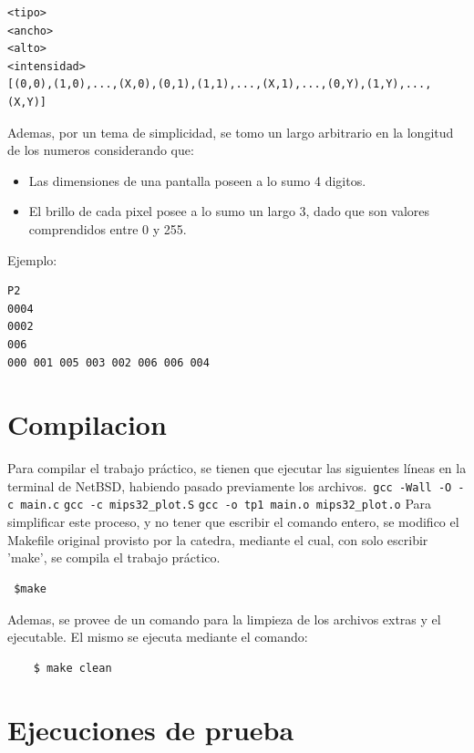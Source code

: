 \documentclass[10pt,spanish,a4paper,openany,notitlepage]{article}
\begin{document}
\begin{framed}
\begin{verbatim}<tipo>
<ancho>
<alto>
<intensidad>
[(0,0),(1,0),...,(X,0),(0,1),(1,1),...,(X,1),...,(0,Y),(1,Y),...,(X,Y)]
\end{verbatim}
\end{framed}

Ademas, por un tema de simplicidad, se tomo un largo arbitrario en la longitud de los numeros considerando que:
\begin{itemize}
\item Las dimensiones de una pantalla poseen a lo sumo 4 digitos.
\item El brillo de cada pixel posee a lo sumo un largo 3, dado que son valores comprendidos entre 0 y 255. 
\end{itemize}
Ejemplo:
\begin{framed}
\begin{verbatim}P2
0004
0002
006
000 001 005 003 002 006 006 004\end{verbatim}
\end{framed}

\section{Compilacion}
Para compilar el trabajo práctico, se tienen que ejecutar las siguientes líneas en la terminal de NetBSD, habiendo pasado previamente los archivos.\
\texttt{gcc -Wall -O -c main.c}
\texttt{gcc -c mips32\_plot.S}
\texttt{gcc -o tp1 main.o mips32\_plot.o}
Para simplificar este proceso, y no tener que escribir el comando entero, se modifico el Makefile original provisto por la catedra, mediante el cual, con solo escribir 'make', se compila el trabajo práctico.

\begin{framed}
\begin{verbatim} $make\end{verbatim}
\end{framed}

Ademas, se provee de un comando para la limpieza de los archivos extras y el ejecutable. El mismo se ejecuta mediante el comando:

\begin{framed}
\begin{verbatim}    $ make clean\end{verbatim}
\end{framed}

\section{Ejecuciones de prueba}
\end{document}
